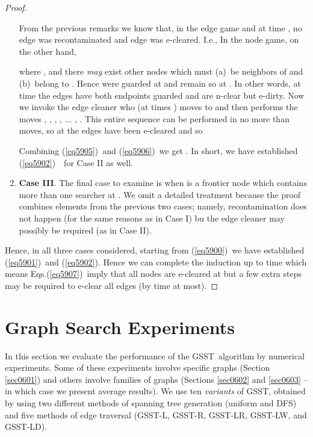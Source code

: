 \documentclass[11pt]{article}\usepackage{amsmath}
\begin{document}
\begin{proof}
\begin{enumerate}
From the previous remarks we know that, in the edge game and at time , no
edge was recontaminated and edge  was e-cleared. I.e.,
In the node game, on the other hand,

where ,  and there \emph{may }exist other nodes  which must (a)\ be neighbors of  and (b)\ belong to
. Hence
 were guarded at  and remain so at . In other words,
at time  the edges  have both endpoints guarded and are
n-clear but e-dirty. Now we invoke the edge cleaner who (at times  ) moves to  and then performs the
moves , , ,
, ... , . This entire sequence can be
performed in no more than  moves, so at 
the edges  have been e-cleared and so

Combining (\ref{eq5905})\ and (\ref{eq5906})\ we get .
In short, we have established (\ref{eq5902})\ \ for Case II as well.
\medskip

\item \textbf{Case III}. The final case to examine is when  is a frontier node
which contains more than one searcher at . We omit a detailed treatment
because the proof combines elements from the previous two cases; namely,
recontamination does not happen (for the same reasons as in Case I) bu the
edge cleaner may possibly be required (as in Case II).
\end{enumerate}

Hence, in all three cases considered, starting from (\ref{eq5900})\ we have
established (\ref{eq5901})\ and (\ref{eq5902}). Hence we can complete the
induction up to time  which means
Eqs.(\ref{eq5907})\ imply that all nodes are e-cleared at  but a few
extra steps may be required to e-clear all edges (by time  at most).
\end{proof}

\begin{center}

\end{center}

\section{Graph Search Experiments}

\label{sec06}

In this section we evaluate the performance of the GSST\ algorithm by
numerical experiments. Some of these experiments involve specific graphs
(Section \ref{sec0601}) and others involve families of graphs (Sections
\ref{sec0602} and \ref{sec0603} -- in which case we present average results).
We use ten \emph{variants }of GSST, obtained by using two different methods of
spanning tree generation (uniform and DFS) and five methods of edge traversal
(GSST-L, GSST-R, GSST-LR, GSST-LW, and GSST-LD).
\end{document}
